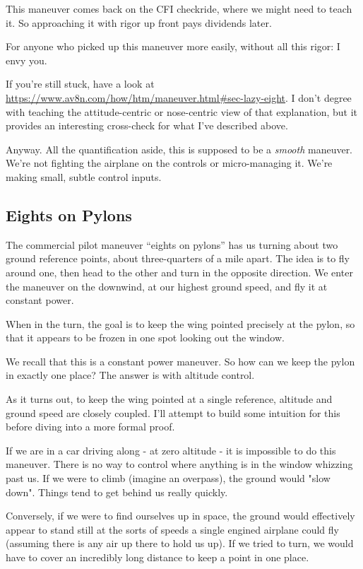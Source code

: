This maneuver comes back on the CFI checkride, where we might need to teach it. So approaching it with rigor up front pays dividends later.

For anyone who picked up this maneuver more easily, without all this rigor: I envy you.

If you're still stuck, have a look at \url{https://www.av8n.com/how/htm/maneuver.html#sec-lazy-eight}. I don't degree with teaching the attitude-centric or nose-centric view of that explanation, but it provides an interesting cross-check for what I've described above.

Anyway. All the quantification aside, this is supposed to be a \emph{smooth} maneuver. We're not fighting the airplane on the controls or micro-managing it. We're making small, subtle control inputs.

\subsection{Eights on Pylons}

The commercial pilot maneuver ``eights on pylons'' has us turning about two ground reference points, about three-quarters of a mile apart. The idea is to fly around one, then head to the other and turn in the opposite direction. We enter the maneuver on the downwind, at our highest ground speed, and fly it at constant power.

When in the turn, the goal is to keep the wing pointed precisely at the pylon, so that it appears to be frozen in one spot looking out the window.

We recall that this is a constant power maneuver. So how can we keep the pylon in exactly one place? The answer is with altitude control.

As it turns out, to keep the wing pointed at a single reference, altitude and ground speed are closely coupled. I'll attempt to build some intuition for this before diving into a more formal proof.

If we are in a car driving along - at zero altitude - it is impossible to do this maneuver. There is no way to control where anything is in the window whizzing past us. If we were to climb (imagine an overpass), the ground would "slow down". Things tend to get behind us really quickly.

Conversely, if we were to find ourselves up in space, the ground would effectively appear to stand still at the sorts of speeds a single engined airplane could fly (assuming there is any air up there to hold us up). If we tried to turn, we would have to cover an incredibly long distance to keep a point in one place.

